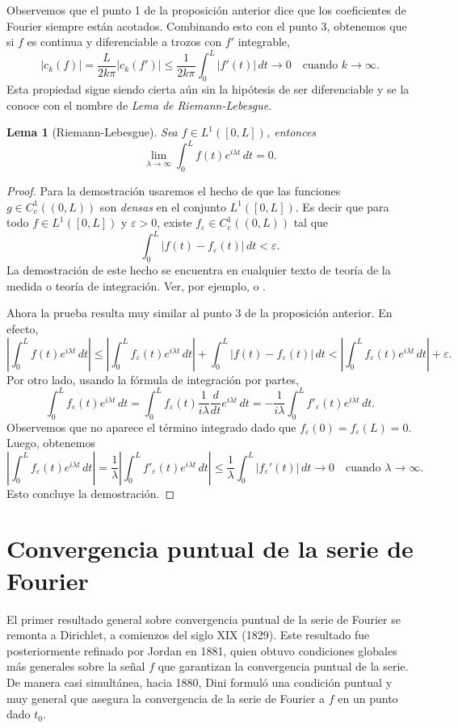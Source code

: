 \documentclass[12pt, a4paper]{amsbook}
\newcommand{\ve}{\varepsilon}
\newtheorem{lema}[teo]{Lema}
\theoremstyle{remark}
\theoremstyle{definition}
\numberwithin{section}{chapter}
\numberwithin{subsection}{section}
\numberwithin{equation}{section}
\numberwithin{figure}{chapter}
\begin{document}
Observemos que el punto 1 de la proposición anterior dice que los coeficientes de Fourier siempre están acotados. Combinando esto con el punto 3, obtenemos que si $f$ es continua y diferenciable a trozos con $f'$ integrable, 
$$
|c_k(f)| = \frac{L}{2k\pi}|c_k(f')|\le \frac{1}{2k\pi}\int_0^L |f'(t)|\, dt \to 0 \quad \text{cuando }k\to\infty.
$$
Esta propiedad sigue siendo cierta aún sin la hipótesis de ser diferenciable y se la conoce con el nombre de {\em Lema de Riemann-Lebesgue}.

\begin{lema}[Riemann-Lebesgue]\label{lema.RL}
Sea $f\in L^1([0,L])$, entonces
$$
\lim_{\lambda\to\infty}\int_0^L f(t)e^{i\lambda t}\, dt = 0.
$$
\end{lema}

\begin{proof}
Para la demostración usaremos el hecho de que las funciones $g\in C^1_c((0,L))$ son {\em densas} en el conjunto $L^1([0,L])$. Es decir que para todo $f\in L^1([0,L])$ y $\ve>0$, existe $f_\ve\in C^1_c((0,L))$ tal que
$$
\int_0^L |f(t)-f_\ve(t)|\, dt < \ve.
$$
La demostración de este hecho se encuentra en cualquier texto de teoría de la medida o teoría de integración. Ver, por ejemplo, \cite{Fava} o \cite{Zygmund}.

Ahora la prueba resulta muy similar al punto 3 de la proposición anterior. En efecto,
$$
\left|\int_0^L f(t)e^{i\lambda t}\, dt\right|\le \left|\int_0^L f_\ve(t)e^{i\lambda t}\, dt \right| + \int_0^L |f(t)-f_\ve(t)|\, dt < \left|\int_0^L f_\ve(t)e^{i\lambda t}\, dt \right| + \ve.
$$
Por otro lado, usando la fórmula de integración por partes,
$$
\int_0^L f_\ve(t)e^{i\lambda t}\, dt = \int_0^L f_\ve(t)\frac{1}{i\lambda}\frac{d}{dt}e^{i\lambda t}\, dt = -\frac{1}{i\lambda}\int_0^L f'_\ve(t) e^{i\lambda t}\, dt.
$$
Observemos que no aparece el término integrado dado que $f_\ve(0)=f_\ve(L)=0$. Luego, obtenemos
$$
 \left|\int_0^L f_\ve(t)e^{i\lambda t}\, dt \right| = \frac{1}{\lambda} \left|\int_0^L f'_\ve(t)e^{i\lambda t}\, dt \right|\le \frac{1}{\lambda}  \int_0^L |f_\ve'(t)|\, dt\to 0 \quad \text{cuando }\lambda\to\infty.
$$
Esto concluye la demostración.
\end{proof}

\section{Convergencia puntual de la serie de Fourier}

El primer resultado general sobre convergencia puntual de la serie de Fourier se remonta a Dirichlet, a comienzos del siglo XIX (1829). Este resultado fue posteriormente refinado por Jordan en 1881, quien obtuvo condiciones globales más generales sobre la señal $f$ que garantizan la convergencia puntual de la serie. De manera casi simultánea, hacia 1880, Dini formuló una condición puntual y muy general que asegura la convergencia de la serie de Fourier a $f$ en un punto dado $t_0$.
\end{document}
